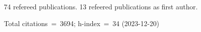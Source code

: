 74 refereed publications. 13 refeered publications as first author.

Total citations~=~3694; h-index~=~34 (2023-12-20)